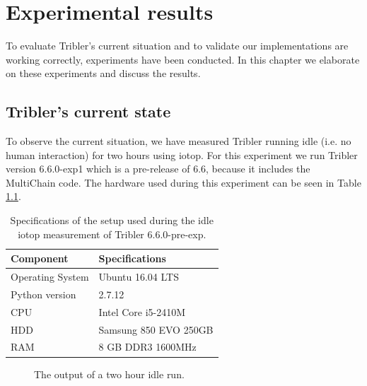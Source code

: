 \chapter{Experimental results}
\label{cpt:experiments}

To evaluate Tribler's current situation and to validate our implementations are working correctly, experiments have been conducted.
In this chapter we elaborate on these experiments and discuss the results. 

\section{Tribler's current state}
To observe the current situation, we have measured Tribler running idle (i.e. no human interaction) for two hours using iotop.
For this experiment we run Tribler version 6.6.0-exp1 which is a pre-release of 6.6, because it includes the MultiChain code.
The hardware used during this experiment can be seen in Table \ref{table:tribler_idle}.

\begin{table}[h]
	\centering
	\begin{tabular}{l|l}
		\textbf{Component} 	& \textbf{Specifications} \\ \hline
		Operating System   	& Ubuntu 16.04 LTS \\
		Python version		& 2.7.12 \\
		CPU					& Intel Core i5-2410M \\ 
		HDD					& Samsung 850 EVO 250GB  \\ 
		RAM					& 8 GB DDR3 1600MHz \\
	\end{tabular}
	\caption{Specifications of the setup used during the idle iotop measurement of Tribler 6.6.0-pre-exp.}
	\label{table:tribler_idle}
\end{table}

\begin{figure}[h]
	\caption{The output of a two hour idle run.}
	\label{fig:htop_io_idle_run}
\end{figure} 

